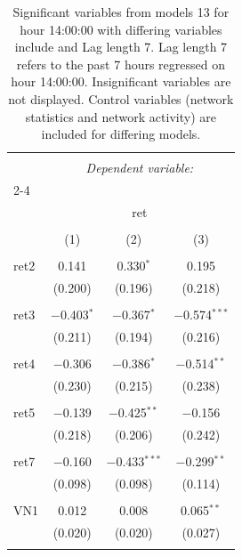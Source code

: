 
\begin{table}[!htbp] \centering 
  \caption{Significant variables from models 13 for hour 14:00:00 with differing variables include 
                               and Lag length 7. Lag length 7 refers to the past 7 hours regressed on hour 14:00:00. 
                               Insignificant variables are not displayed. 
                               Control variables (network statistics and network activity) are 
                               included for differing models.} 
  \label{RVmodels2_t_hourlagged1} 
\scriptsize 
\begin{tabular}{@{\extracolsep{5pt}}lccc} 
\\[-1.8ex]\hline 
\hline \\[-1.8ex] 
 & \multicolumn{3}{c}{\textit{Dependent variable:}} \\ 
\cline{2-4} 
\\[-1.8ex] & \multicolumn{3}{c}{ret} \\ 
\\[-1.8ex] & (1) & (2) & (3)\\ 
\hline \\[-1.8ex] 
 ret2 & 0.141 & 0.330$^{*}$ & 0.195 \\ 
  & (0.200) & (0.196) & (0.218) \\ 
  & & & \\ 
 ret3 & $-$0.403$^{*}$ & $-$0.367$^{*}$ & $-$0.574$^{***}$ \\ 
  & (0.211) & (0.194) & (0.216) \\ 
  & & & \\ 
 ret4 & $-$0.306 & $-$0.386$^{*}$ & $-$0.514$^{**}$ \\ 
  & (0.230) & (0.215) & (0.238) \\ 
  & & & \\ 
 ret5 & $-$0.139 & $-$0.425$^{**}$ & $-$0.156 \\ 
  & (0.218) & (0.206) & (0.242) \\ 
  & & & \\ 
 ret7 & $-$0.160 & $-$0.433$^{***}$ & $-$0.299$^{**}$ \\ 
  & (0.098) & (0.098) & (0.114) \\ 
  & & & \\ 
 VN1 & 0.012 & 0.008 & 0.065$^{**}$ \\ 
  & (0.020) & (0.020) & (0.027) \\ 
  & & & \\ 

\end{tabular}
\end{table}
